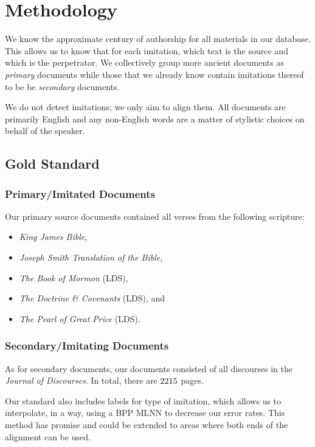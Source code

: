 \section {Methodology}

We know the approximate century of authorship for all materials in our database. This allows us to know that for each imitation, which text is the source and which is the perpetrator. We collectively group more ancient documents as \textit{primary} documents while those that we already know contain imitations thereof to be be \textit{secondary} documents.

We do not detect imitations; we only aim to align them.  All documents are primarily English and any non-English words are a matter of stylistic choices on behalf of the speaker.  

\subsection{Gold Standard}
\subsubsection{Primary/Imitated Documents}
Our primary source documents contained all verses from the following scripture:
	\begin{itemize}
		\item \textit{King James Bible},
		\item \textit{Joseph Smith Translation of the Bible},
		\item \textit{The Book of Mormon} (LDS),
		\item \textit{The Doctrine \& Covenants} (LDS), and
		\item \textit{The Pearl of Great Price} (LDS). 
	\end{itemize}

\subsubsection{Secondary/Imitating Documents}
As for secondary documents, our documents consisted of all discourses in the \textit{Journal of Discourses}. In total, there are $2215$ pages.

Our standard also includes labels for type of imitation, which allows us to interpolate, in a way, using a BPP MLNN to decrease our error rates. This method has promise and could be extended to areas where both ends of the alignment can be used.

